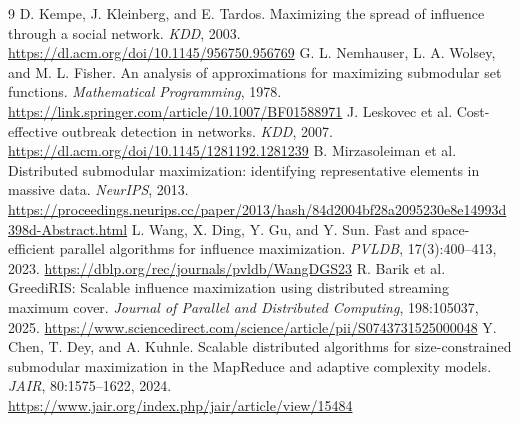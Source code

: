 \documentclass[10pt]{article}
\begin{document}
\begin{thebibliography}{9}
\setlength{\itemsep}{0pt}
 D. Kempe, J. Kleinberg, and E. Tardos. Maximizing the spread of influence through a social network. \emph{KDD}, 2003. \url{https://dl.acm.org/doi/10.1145/956750.956769}
 G. L. Nemhauser, L. A. Wolsey, and M. L. Fisher. An analysis of approximations for maximizing submodular set functions. \emph{Mathematical Programming}, 1978. \url{https://link.springer.com/article/10.1007/BF01588971}
 J. Leskovec et al. Cost-effective outbreak detection in networks. \emph{KDD}, 2007. \url{https://dl.acm.org/doi/10.1145/1281192.1281239}
 B. Mirzasoleiman et al. Distributed submodular maximization: identifying representative elements in massive data. \emph{NeurIPS}, 2013. \url{https://proceedings.neurips.cc/paper/2013/hash/84d2004bf28a2095230e8e14993d398d-Abstract.html}
 L. Wang, X. Ding, Y. Gu, and Y. Sun. Fast and space-efficient parallel algorithms for influence maximization. \emph{PVLDB}, 17(3):400--413, 2023. \url{https://dblp.org/rec/journals/pvldb/WangDGS23}
 R. Barik et al. GreediRIS: Scalable influence maximization using distributed streaming maximum cover. \emph{Journal of Parallel and Distributed Computing}, 198:105037, 2025. \url{https://www.sciencedirect.com/science/article/pii/S0743731525000048}
 Y. Chen, T. Dey, and A. Kuhnle. Scalable distributed algorithms for size-constrained submodular maximization in the MapReduce and adaptive complexity models. \emph{JAIR}, 80:1575--1622, 2024. \url{https://www.jair.org/index.php/jair/article/view/15484}
\end{thebibliography}
\end{document}
